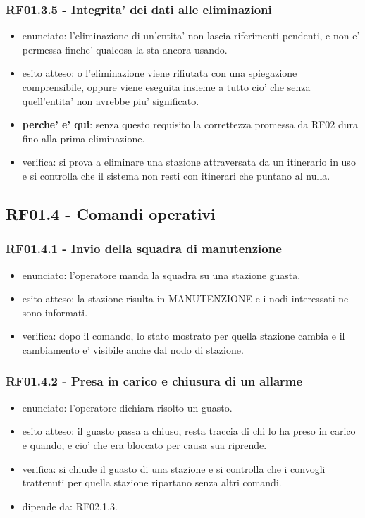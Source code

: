 \documentclass[11pt]{article}
\begin{document}
\subsubsection{RF01.3.5 - Integrita' dei dati alle eliminazioni}
\label{sec:orgebfbb82}
\begin{itemize}
\item enunciato: l'eliminazione di un'entita' non lascia riferimenti pendenti, e non e' permessa finche'
qualcosa la sta ancora usando.
\item esito atteso: o l'eliminazione viene rifiutata con una spiegazione comprensibile, oppure viene
eseguita insieme a tutto cio' che senza quell'entita' non avrebbe piu' significato.
\item \textbf{perche' e' qui}: senza questo requisito la correttezza promessa da RF02 dura fino alla prima
eliminazione.
\item verifica: si prova a eliminare una stazione attraversata da un itinerario in uso e si controlla che
il sistema non resti con itinerari che puntano al nulla.
\end{itemize}
\subsection{RF01.4 - Comandi operativi}
\label{sec:orgf24b73d}

\subsubsection{RF01.4.1 - Invio della squadra di manutenzione}
\label{sec:orgc5e03a4}
\begin{itemize}
\item enunciato: l'operatore manda la squadra su una stazione guasta.
\item esito atteso: la stazione risulta in MANUTENZIONE e i nodi interessati ne sono informati.
\item verifica: dopo il comando, lo stato mostrato per quella stazione cambia e il cambiamento e'
visibile anche dal nodo di stazione.
\end{itemize}
\subsubsection{RF01.4.2 - Presa in carico e chiusura di un allarme}
\label{sec:orgf5e4aa9}
\begin{itemize}
\item enunciato: l'operatore dichiara risolto un guasto.
\item esito atteso: il guasto passa a chiuso, resta traccia di chi lo ha preso in carico e quando, e cio'
che era bloccato per causa sua riprende.
\item verifica: si chiude il guasto di una stazione e si controlla che i convogli trattenuti per quella
stazione ripartano senza altri comandi.
\item dipende da: RF02.1.3.
\end{itemize}
\end{document}
